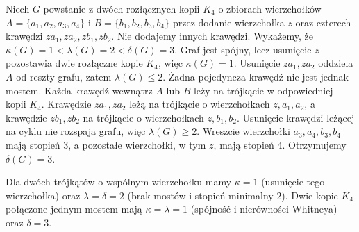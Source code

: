 \begin{przyklad}
\label{ex:tg-whitney-strict}
Niech $G$ powstanie z dwóch rozłącznych kopii $K_4$
o zbiorach wierzchołków $A=\{a_1,a_2,a_3,a_4\}$
i $B=\{b_1,b_2,b_3,b_4\}$ przez dodanie wierzchołka
$z$ oraz czterech krawędzi $za_1,za_2,zb_1,zb_2$.
Nie dodajemy innych krawędzi. Wykażemy, że
$\kappa(G)=1<\lambda(G)=2<\delta(G)=3$.
Graf jest spójny, lecz usunięcie $z$
pozostawia dwie rozłączne kopie $K_4$,
więc $\kappa(G)=1$.
Usunięcie $za_1,za_2$ oddziela $A$ od reszty grafu,
zatem $\lambda(G)\le2$. Żadna pojedyncza krawędź
nie jest jednak mostem. Każda krawędź wewnątrz
$A$ lub $B$ leży na trójkącie w odpowiedniej
kopii $K_4$. Krawędzie $za_1,za_2$ leżą na
trójkącie o wierzchołkach $z,a_1,a_2$,
a krawędzie $zb_1,zb_2$ na trójkącie
o wierzchołkach $z,b_1,b_2$. Usunięcie krawędzi
leżącej na cyklu nie rozspaja grafu, więc
$\lambda(G)\ge2$.
Wreszcie wierzchołki $a_3,a_4,b_3,b_4$ mają stopień
$3$, a pozostałe wierzchołki, w tym $z$, mają stopień
$4$. Otrzymujemy $\delta(G)=3$.

Dla dwóch trójkątów o wspólnym wierzchołku mamy $\kappa=1$
(usunięcie tego wierzchołka) oraz $\lambda=\delta=2$
(brak mostów i stopień minimalny $2$).
Dwie kopie $K_4$ połączone jednym mostem mają
$\kappa=\lambda=1$ (spójność i nierówności Whitneya)
oraz $\delta=3$.
\end{przyklad}
